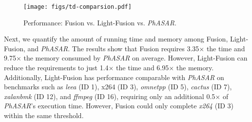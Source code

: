 
\begin{figure}[t]
    \centering
    \texttt{[image: figs/td-comparsion.pdf]}
    \caption{Performance: Fusion vs. Light-Fusion vs. \textit{PhASAR}.}
    \label{fig:td-comparsion}
\end{figure}

Next, we quantify the amount of running time and memory among Fusion, Light-Fusion, and \textit{PhASAR}. 
The results show that Fusion requires 3.35$\times$ the time and 9.75$\times$ the memory consumed by \textit{PhASAR} on average.
However, Light-Fusion can reduce the requirements to just 1.4$\times$ the time and 6.95$\times$ the memory.
Additionally, Light-Fusion has performance comparable with \textit{PhASAR} on benchmarks such as \textit{leea} (ID 1), x264 (ID 3), \textit{omnetpp} (ID 5), \textit{cactus} (ID 7), \textit{xalanbmk} (ID 12), and \textit{ffmpeg} (ID 16), requiring only an additional 0.5$\times$ of \textit{PhASAR}'s execution time. 
However, Fusion could only complete \textit{x264} (ID 3) within the same threshold.

